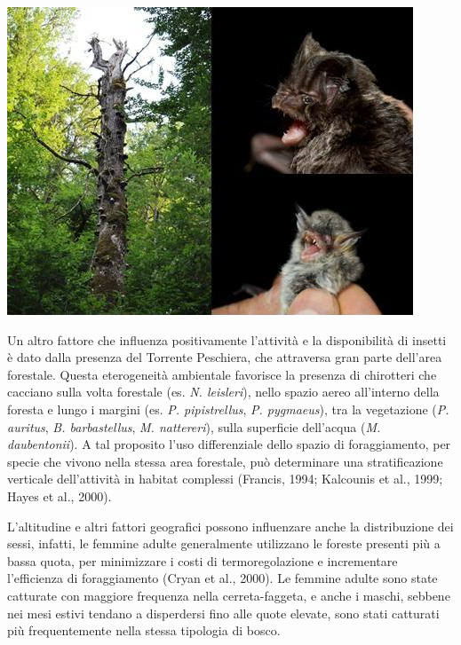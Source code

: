 \begin{multicols}{2}
\begin{Figure}
  \centering\small
  \includegraphics[width=\linewidth]{abstracts/extended_abstracts/P005_Figure2.png}
\end{Figure}

Un altro fattore che influenza positivamente l’attività e la disponibilità di insetti è dato dalla presenza del Torrente Peschiera, che attraversa gran parte dell’area forestale. Questa eterogeneità ambientale favorisce la presenza di chirotteri che cacciano sulla volta forestale (es. \emph{N. leisleri}), nello spazio aereo all’interno della foresta e lungo i margini (es. \emph{P. pipistrellus}, \emph{P. pygmaeus}), tra la vegetazione (\emph{P. auritus}, \emph{B. barbastellus}, \emph{M. nattereri}), sulla superficie dell’acqua (\emph{M. daubentonii}). A tal proposito l’uso differenziale dello spazio di foraggiamento, per specie che vivono nella stessa area forestale, può determinare una stratificazione verticale dell’attività in habitat complessi (Francis, 1994; Kalcounis et al., 1999; Hayes et al., 2000). 

L’altitudine e altri fattori geografici possono influenzare anche la distribuzione dei sessi, infatti, le femmine adulte generalmente utilizzano le foreste presenti più a bassa quota, per minimizzare i costi di termoregolazione e incrementare l’efficienza di foraggiamento (Cryan et al., 2000). Le femmine adulte sono state catturate con maggiore frequenza nella cerreta-faggeta, e anche i maschi, sebbene nei mesi estivi tendano a disperdersi fino alle quote elevate, sono stati catturati più frequentemente nella stessa tipologia di bosco. 


\end{multicols}
